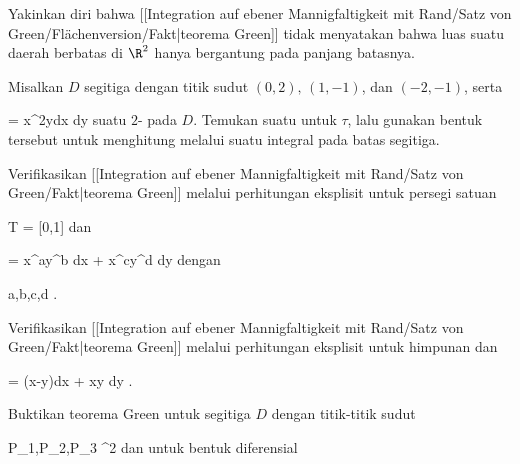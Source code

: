 {}
{

Yakinkan diri bahwa
[[Integration auf ebener Mannigfaltigkeit mit Rand/Satz von Green/Flächenversion/Fakt|teorema Green]]
tidak menyatakan bahwa luas suatu daerah berbatas di $\R^2$ hanya bergantung pada panjang batasnya.

}
{} {}

{}
{

Misalkan $D$ segitiga dengan titik sudut
$(0,2),\, (1,-1)$, dan $(-2,-1)$,
serta

\mavergleichskette
{\vergleichskette
{ \tau
}
{ = }{ x^2ydx \wedge dy
}
{  }{
}
{    }{
}
{   }{
}
}
{}{}{}
suatu
$2$- pada $D$. Temukan suatu
untuk $\tau$, lalu gunakan bentuk tersebut untuk menghitung
 melalui suatu integral pada batas segitiga.

}
{} {}

{}
{

Verifikasikan
[[Integration auf ebener Mannigfaltigkeit mit Rand/Satz von Green/Fakt|teorema Green]]
melalui perhitungan eksplisit untuk persegi satuan

\mavergleichskette
{\vergleichskette
{ T
}
{ = }{ [0,1] \times [0,1]
}
{  }{
}
{    }{
}
{   }{
}
}
{}{}{}
dan

\mavergleichskettedisp
{\vergleichskette
{ \omega
}
{ =} { x^ay^b dx + x^cy^d dy
}
{ } {
}
{ } {
}
{ } {
}
}
{}{}{}
dengan

\mavergleichskette
{\vergleichskette
{ a,b,c,d
}
{ \in }{ \N
}
{  }{
}
{    }{
}
{   }{
}
}
{}{}{.}

}
{} {}

{}
{

Verifikasikan
[[Integration auf ebener Mannigfaltigkeit mit Rand/Satz von Green/Fakt|teorema Green]]
melalui perhitungan eksplisit untuk himpunan
 {} {}
dan

\mavergleichskette
{\vergleichskette
{ \omega
}
{ = }{(x-y)dx + xy dy
}
{  }{
}
{    }{
}
{   }{
}
}
{}{}{.}

}
{} {}

{}
{

Buktikan teorema Green untuk segitiga $D$ dengan titik-titik sudut

\mavergleichskette
{\vergleichskette
{ P_1,P_2,P_3
}
{ \in }{ \R^2
}
{  }{
}
{    }{
}
{   }{
}
}
{}{}{}
dan untuk bentuk diferensial

}
{} {}

